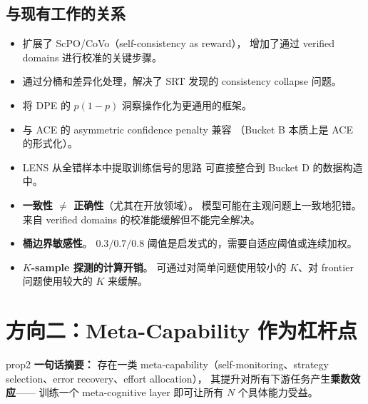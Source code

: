 \documentclass[12pt,a4paper]{article}
\begin{document}
\subsection{与现有工作的关系}

\begin{itemize}[leftmargin=2em]
  \item 扩展了 ScPO/CoVo（self-consistency as reward），
    增加了通过 verified domains 进行校准的关键步骤。
  \item 通过分桶和差异化处理，解决了 SRT 发现的 consistency collapse 问题。
  \item 将 DPE 的 $p(1-p)$ 洞察操作化为更通用的框架。
  \item 与 ACE 的 asymmetric confidence penalty 兼容
    （Bucket B 本质上是 ACE 的形式化）。
  \item LENS 从全错样本中提取训练信号的思路
    可直接整合到 Bucket D 的数据构造中。
\end{itemize}

\begin{riskbox}
\begin{itemize}[leftmargin=1.5em]
  \item \textbf{一致性 $\neq$ 正确性}（尤其在开放领域）。
    模型可能在主观问题上一致地犯错。
    来自 verified domains 的校准能缓解但不能完全解决。
  \item \textbf{桶边界敏感性}。
    $0.3/0.7/0.8$ 阈值是启发式的，需要自适应阈值或连续加权。
  \item \textbf{$K$-sample 探测的计算开销}。
    可通过对简单问题使用较小的 $K$、对 frontier 问题使用较大的 $K$ 来缓解。
\end{itemize}
\end{riskbox}


\newpage
\section{方向二：Meta-Capability 作为杠杆点}
\label{sec:prop2}

\begin{proposalbox}{prop2}
\textbf{一句话摘要：}
存在一类 meta-capability（self-monitoring、strategy selection、error recovery、effort allocation），
其提升对所有下游任务产生\textbf{乘数效应}——
训练一个 meta-cognitive layer 即可让所有 $N$ 个具体能力受益。
\end{proposalbox}
\end{document}
